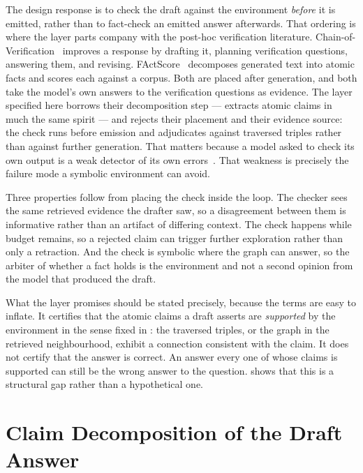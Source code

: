 The design response is to check the draft against the environment \emph{before}
it is emitted, rather than to fact-check an emitted answer afterwards. That
ordering is where the layer parts company with the post-hoc verification
literature. Chain-of-Verification~\cite{dhuliawala2024chain} improves a
response by drafting it, planning verification questions, answering them, and
revising. FActScore~\cite{min2023factscore} decomposes generated text into
atomic facts and scores each against a corpus. Both are placed after
generation, and both take the model's own answers to the verification
questions as evidence. The layer specified here borrows their decomposition
step ---  extracts atomic claims in much the
same spirit --- and rejects their placement and their evidence source: the
check runs before emission and adjudicates against traversed triples rather
than against further generation. That matters because a model asked to check
its own output is a weak detector of its own errors~\cite{huang2024selfcorrect}.
That weakness is precisely the failure mode a symbolic environment can avoid.

Three properties follow from placing the check inside the loop. The checker sees
the same retrieved evidence the drafter saw, so a disagreement between them is
informative rather than an artifact of differing context. The check happens
while budget remains, so a rejected claim can trigger further exploration rather
than only a retraction. And the check is symbolic where the graph can answer, so
the arbiter of whether a fact holds is the environment and not a second opinion
from the model that produced the draft.

What the layer promises should be stated precisely, because the terms are easy
to inflate. It certifies that the atomic claims a draft asserts are
\emph{supported} by the environment in the sense fixed in
: the traversed triples, or the graph in the
retrieved neighbourhood, exhibit a connection consistent with the claim. It does
not certify that the answer is correct. An answer every one of whose claims is
supported can still be the wrong answer to the question.
 shows that this is a structural gap rather than
a hypothetical one.

\section{Claim Decomposition of the Draft Answer}\label{sec:claim-decomposition}


